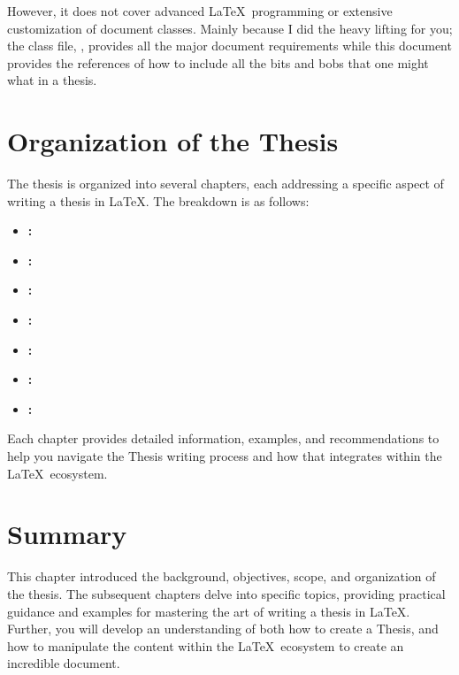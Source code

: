 		However, it does not cover advanced \LaTeX\ programming or extensive customization of document classes.
		Mainly because I did the heavy lifting for you; the class file, , provides all the major document requirements while this document provides the references of how to include all the bits and bobs that one might what in a thesis.

	\section{Organization of the Thesis}
		The thesis is organized into several chapters, each addressing a specific aspect of writing a thesis in \LaTeX. 
		The breakdown is as follows:
		\begin{itemize}
			\item \textbf{:}  
			\item \textbf{:}  
			\item \textbf{:}  
			\item \textbf{:}  
			\item \textbf{:}  
			\item \textbf{:}  
			\item \textbf{:}  
		\end{itemize}

		Each chapter provides detailed information, examples, and recommendations to help you navigate the Thesis writing process and how that integrates within the \LaTeX\ ecosystem.

	\section{Summary}
		This chapter introduced the background, objectives, scope, and organization of the thesis. 
		The subsequent chapters delve into specific topics, providing practical guidance and examples for mastering the art of writing a thesis in \LaTeX.
		Further, you will develop an understanding of both how to create a Thesis, and how to manipulate the content within the \LaTeX\ ecosystem to create an incredible document.